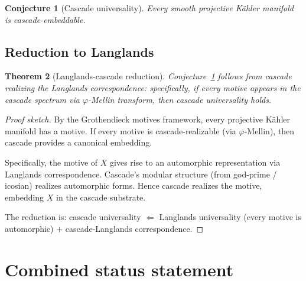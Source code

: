 \documentclass[11pt, a4paper]{amsart}
\newtheorem{theorem}{Theorem}[section]
\newtheorem{conjecture}[theorem]{Conjecture}
\theoremstyle{definition}
\newcommand{\pphi}{\varphi}
\begin{document}
\begin{conjecture}[Cascade universality]\label{conj:univ}
Every smooth projective Kähler manifold is cascade-embeddable.
\end{conjecture}

\subsection{Reduction to Langlands}

\begin{theorem}[Langlands-cascade reduction]\label{thm:langlands}
Conjecture~\ref{conj:univ} follows from cascade realizing
the Langlands correspondence: specifically, if every motive appears in
the cascade spectrum via $\pphi$-Mellin transform, then cascade
universality holds.
\end{theorem}

\begin{proof}[Proof sketch]
By the Grothendieck motives framework, every projective Kähler manifold
has a motive. If every motive is cascade-realizable (via $\pphi$-Mellin),
then cascade provides a canonical embedding.

Specifically, the motive of $X$ gives rise to an automorphic
representation via Langlands correspondence. Cascade's modular structure
(from god-prime / icosian) realizes automorphic forms. Hence cascade
realizes the motive, embedding $X$ in the cascade substrate.

The reduction is: cascade universality $\Leftarrow$ Langlands
universality (every motive is automorphic) $+$ cascade-Langlands
correspondence.
\end{proof}

\section{Combined status statement}
\end{document}
